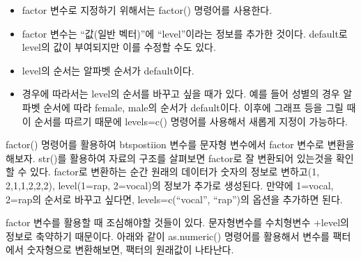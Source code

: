 \documentclass[
]{book}
\newenvironment{Shaded}{\begin{snugshade}}{\end{snugshade}}
\newcommand{\AttributeTok}[1]{\textcolor[rgb]{0.13,0.29,0.53}{#1}}
\newcommand{\DocumentationTok}[1]{\textcolor[rgb]{0.56,0.35,0.01}{\textbf{\textit{#1}}}}
\newcommand{\FunctionTok}[1]{\textcolor[rgb]{0.13,0.29,0.53}{\textbf{#1}}}
\newcommand{\NormalTok}[1]{#1}
\newcommand{\OtherTok}[1]{\textcolor[rgb]{0.56,0.35,0.01}{#1}}
\newcommand{\SpecialCharTok}[1]{\textcolor[rgb]{0.81,0.36,0.00}{\textbf{#1}}}
\newcommand{\StringTok}[1]{\textcolor[rgb]{0.31,0.60,0.02}{#1}}
\providecommand{\tightlist}{%
  \setlength{\itemsep}{0pt}\setlength{\parskip}{0pt}}
\begin{document}
\begin{itemize}
\tightlist
\item
  factor 변수로 지정하기 위해서는 factor() 명령어를 사용한다.
\item
  factor 변수는 ``값(일반 벡터)''에 ``level''이라는 정보를 추가한 것이다. default로 level의 값이 부여되지만 이를 수정할 수도 있다.
\item
  level의 순서는 알파벳 순서가 default이다.
\item
  경우에 따라서는 level의 순서를 바꾸고 싶을 때가 있다. 예를 들어 성별의 경우 알파벳 순서에 따라 female, male의 순서가 default이다. 이후에 그래프 등을 그릴 때 이 순서를 따르기 때문에 levels=c() 명령어를 사용해서 새롭게 지정이 가능하다.
\end{itemize}

factor() 명령어를 활용하여 btspostiion 변수를 문자형 변수에서 factor 변수로 변환을 해보자. str()를 활용하여 자료의 구조를 살펴보면 factor로 잘 변환되어 있는것을 확인할 수 있다. factor로 변환하는 순간 원래의 데이터가 숫자의 정보로 변하고(1, 2,1,1,2,2,2), level(1=rap, 2=vocal)의 정보가 추가로 생성된다. 만약에 1=vocal, 2=rap의 순서로 바꾸고 싶다면, levels=c(``vocal'', ``rap'')의 옵션을 추가하면 된다.

\begin{Shaded}
\end{Shaded}

factor 변수를 활용할 때 조심해야할 것들이 있다. 문자형변수를 수치형변수 +level의 정보로 축약하기 때문이다. 아래와 같이 as.numeric() 명령어를 활용해서 변수를 팩터에서 숫자형으로 변환해보면, 팩터의 원래값이 나타난다.
\end{document}
